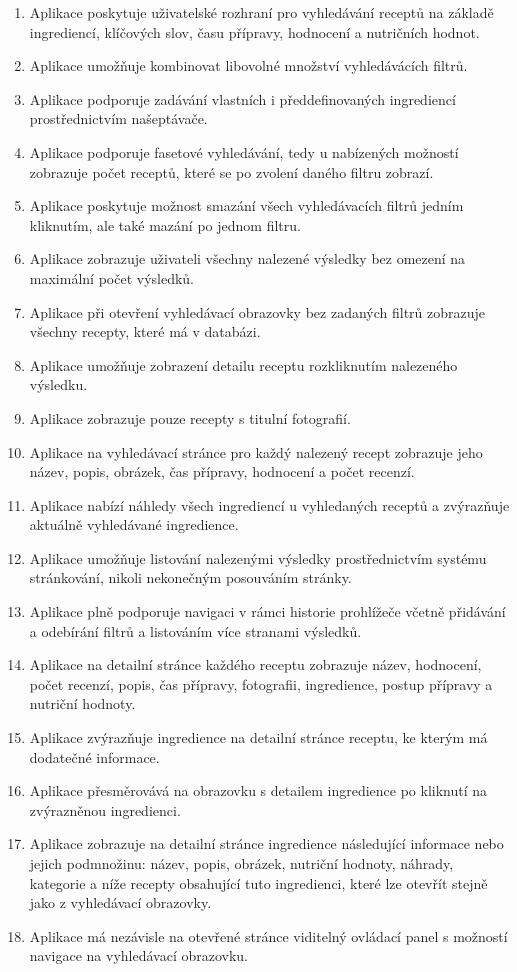 \begin{enumerate}
    \item Aplikace poskytuje uživatelské rozhraní pro vyhledávání receptů na základě ingrediencí, klíčových slov, času přípravy, hodnocení a nutričních hodnot.
    \item Aplikace umožňuje kombinovat libovolné množství vyhledávácích filtrů.
    \item Aplikace podporuje zadávání vlastních i předdefinovaných ingrediencí prostřednictvím našeptávače.
    \item Aplikace podporuje fasetové vyhledávání, tedy u nabízených možností zobrazuje počet receptů, které se po zvolení daného filtru zobrazí.
    \item Aplikace poskytuje možnost smazání všech vyhledávacích filtrů jedním kliknutím, ale také mazání po jednom filtru.
    \item Aplikace zobrazuje uživateli všechny nalezené výsledky bez omezení na maximální počet výsledků.
    \item Aplikace při otevření vyhledávací obrazovky bez zadaných filtrů zobrazuje všechny recepty, které má v databázi.
    \item Aplikace umožňuje zobrazení detailu receptu rozkliknutím nalezeného výsledku.
    \item Aplikace zobrazuje pouze recepty s titulní fotografií.
    \item Aplikace na vyhledávací stránce pro každý nalezený recept zobrazuje jeho název, popis, obrázek, čas přípravy, hodnocení a počet recenzí.
    \item Aplikace nabízí náhledy všech ingrediencí u vyhledaných receptů a zvýrazňuje aktuálně vyhledávané ingredience.
    \item Aplikace umožňuje listování nalezenými výsledky prostřednictvím systému stránkování, nikoli nekonečným posouváním stránky.
    \item Aplikace plně podporuje navigaci v rámci historie prohlížeče včetně přidávání a odebírání filtrů a listováním více stranami výsledků.
    \item Aplikace na detailní stránce každého receptu zobrazuje název, hodnocení, počet recenzí, popis, čas přípravy, fotografii, ingredience, postup přípravy a nutriční hodnoty.
    \item Aplikace zvýrazňuje ingredience na detailní stránce receptu, ke kterým má dodatečné informace.
    \item Aplikace přesměrovává na obrazovku s detailem ingredience po kliknutí na zvýrazněnou ingredienci.
    \item Aplikace zobrazuje na detailní stránce ingredience následující informace nebo jejich podmnožinu: název, popis, obrázek, nutriční hodnoty, náhrady, kategorie a níže recepty obsahující tuto ingredienci, které lze otevřít stejně jako z vyhledávací obrazovky.
    \item Aplikace má nezávisle na otevřené stránce viditelný ovládací panel s možností navigace na vyhledávací obrazovku.

\end{enumerate}

